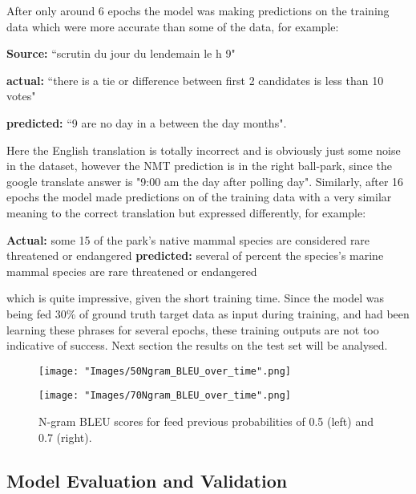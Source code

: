 \documentclass[]{article}
\begin{document}
After only around 6 epochs the model was making predictions on the training data which were more accurate than some of the data, for example: 

\begin{center}
	\textbf{Source:} ``scrutin du jour du lendemain le h 9" 
	
	\textbf{actual:} ``there is a tie or difference between first 2 candidates is less than 10 votes" 
	
	\textbf{predicted:}  ``9 are no day in a between the day months".

\end{center}
Here the English translation is totally incorrect and is obviously just some noise in the dataset, however the NMT prediction is in the right ball-park, since the google translate answer is "9:00 am the day after polling day". Similarly, after 16 epochs the model made predictions on of the training data with a very similar meaning to the correct translation but expressed differently, for example:
\begin{center}
\textbf{Actual:} some 15 of the park's native mammal species are considered rare threatened or endangered 
\textbf{predicted:} several of percent the species's marine mammal species are rare threatened or endangered
\end{center}
which is quite impressive, given the short training time. Since the model was being fed 30\% of ground truth target data as input during training, and had been learning these phrases for several epochs, these training outputs are not too indicative of success. Next section the results on the test set will be analysed.
\begin{figure}[h]
	\centering
	\begin{minipage}[b]{0.48\textwidth}
		\texttt{[image: "Images/50Ngram\_BLEU\_over\_time".png]}
	\end{minipage}
	\begin{minipage}[b]{0.48\textwidth}
		\texttt{[image: "Images/70Ngram\_BLEU\_over\_time".png]}
	\end{minipage}
	\caption{N-gram BLEU scores for feed previous probabilities of 0.5 (left) and 0.7 (right). }
	\label{fig:over_time}
\end{figure}

\subsection{Model Evaluation and Validation}
\end{document}
